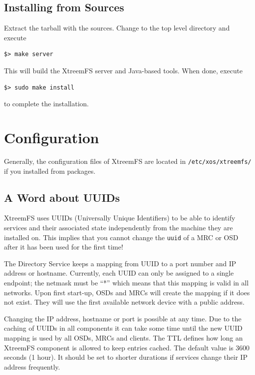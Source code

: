 \documentclass[a4paper,10pt]{book}
\begin{document}
\subsection{Installing from Sources}

Extract the tarball with the sources. Change to the top level directory and execute

\begin{verbatim}
$> make server
\end{verbatim}

This will build the XtreemFS server and Java-based tools. When done, execute

\begin{verbatim}
$> sudo make install
\end{verbatim}

to complete the installation.

\section{Configuration}
\label{sec:service_config}

Generally, the configuration files of XtreemFS are located in \texttt{/etc/xos/xtreemfs/} if you installed from packages.


\subsection{A Word about UUIDs}

XtreemFS uses UUIDs (Universally Unique Identifiers) to be able to identify services and their associated state independently from the machine they are installed on. This implies that you cannot change the \texttt{uuid} of a MRC or OSD after it has been used for the first time!

The Directory Service keeps a mapping from UUID to a port number and IP address or hostname. Currently, each UUID can only be assigned to a single endpoint; the netmask must be ``*'' which means that this mapping is valid in all networks. Upon first start-up, OSDs and MRCs will create the mapping if it does not exist. They will use the first available network device with a public address.

Changing the IP address, hostname or port is possible at any time. Due to the caching of UUIDs in all components it can take some time until the new UUID mapping is used by all OSDs, MRCs and clients. The TTL defines how long an XtreemFS component is allowed to keep entries cached. The default value is 3600 seconds (1 hour). It should be set to shorter durations if services change their IP address frequently.
\end{document}
